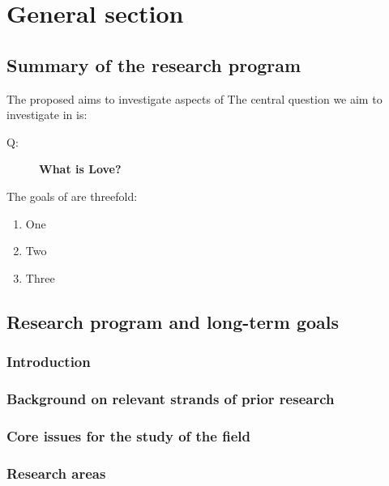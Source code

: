 \chapter{General section}

\section{Summary of the research program}

The proposed \thiscrc{} aims to investigate aspects of \blindtext
The central question we aim to
investigate in \thiscrc{} is:

\begin{description}
\item[Q:] \textbf{What is Love?} 
\end{description}

\blindtext \textcite{test1}

The goals of \thiscrc{} are threefold:
\begin{enumerate}
\item One
\item Two
\item Three
\end{enumerate}

\section{Research program and long-term goals}

\subsection{Introduction}
\label{sec:intr-regist-regist}

\blindtext \textcite{buch1}

\subsection{Background on relevant strands of prior research }
\label{sec:backgr-relev-strands}

\blindtext \textcite{teil1}

\subsection{Core issues for the study of the field}
\label{sec:core-issues-crc}


\subsection{Research areas}
\label{sec:research-areas}

